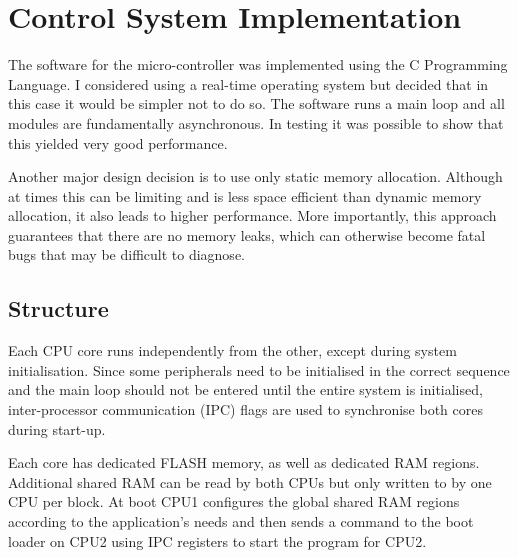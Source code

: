 
\chapter{Control System Implementation}

The software for the micro-controller was implemented using the C Programming Language. I considered using a real-time operating system but decided that in this case it would be simpler not to do so. The software runs a main loop and all modules are fundamentally asynchronous. In testing it was possible to show that this yielded very good performance.

Another major design decision is to use only static memory allocation. Although at times this can be limiting and is less space efficient than dynamic memory allocation, it also leads to higher performance. More importantly, this approach guarantees that there are no memory leaks, which can otherwise become fatal bugs that may be difficult to diagnose.

\section{Structure} \label{impelementation_structure}

Each CPU core runs independently from the other, except during system initialisation. Since some peripherals need to be initialised in the correct sequence and the main loop should not be entered until the entire system is initialised, inter-processor communication (IPC) flags are used to synchronise both cores during start-up.

Each core has dedicated FLASH memory, as well as dedicated RAM regions. Additional shared RAM can be read by both CPUs but only written to by one CPU per block. At boot CPU1 configures the global shared RAM regions according to the application's needs and then sends a command to the boot loader on CPU2 using IPC registers to start the program for CPU2.

